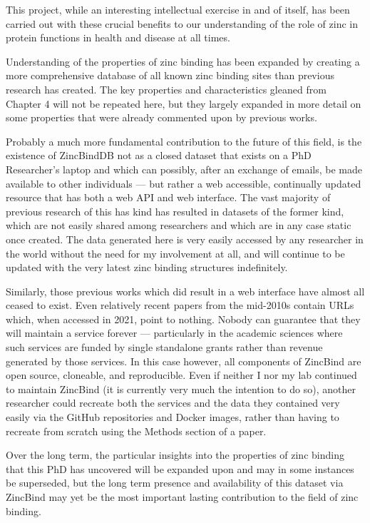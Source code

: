 This project, while an interesting intellectual exercise in and of itself, has been carried out with these crucial benefits to our understanding of the role of zinc in protein functions in health and disease at all times.

Understanding of the properties of zinc binding has been expanded by creating a more comprehensive database of all known zinc binding sites than previous research has created. The key properties and characteristics gleaned from Chapter 4 will not be repeated here, but they largely expanded in more detail on some properties that were already commented upon by previous works.

Probably a much more fundamental contribution to the future of this field, is the existence of ZincBindDB not as a closed dataset that exists on a PhD Researcher's laptop and which can possibly, after an exchange of emails, be made available to other individuals ---  but rather a web accessible, continually updated resource that has both a web API and web interface. The vast majority of previous research of this has kind has resulted in datasets of the former kind, which are not easily shared among researchers and which are in any case static once created. The data generated here is very easily accessed by any researcher in the world without the need for my involvement at all, and will continue to be updated with the very latest zinc binding structures indefinitely.

Similarly, those previous works which did result in a web interface have almost all ceased to exist. Even relatively recent papers from the mid-2010s contain URLs which, when accessed in 2021, point to nothing. Nobody can guarantee that they will maintain a service forever --- particularly in the academic sciences where such services are funded by single standalone grants rather than revenue generated by those services. In this case however, all components of ZincBind are open source, cloneable, and reproducible. Even if neither I nor my lab continued to maintain ZincBind (it is currently very much the intention to do so), another researcher could recreate both the services and the data they contained very easily via the GitHub repositories and Docker images, rather than having to recreate from scratch using the Methods section of a paper.

Over the long term, the particular insights into the properties of zinc binding that this PhD has uncovered will be expanded upon and may in some instances be superseded, but the long term presence and availability of this dataset via ZincBind may yet be the most important lasting contribution to the field of zinc binding.


